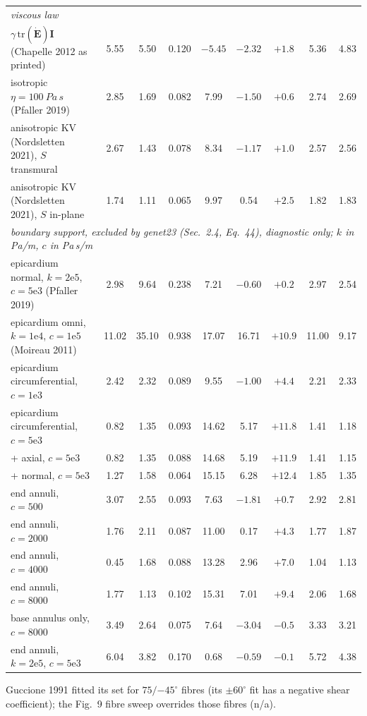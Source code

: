 \documentclass[10pt]{article}
\begin{document}
\begin{center}
\begin{longtable}{lcccccccc}
\multicolumn{9}{l}{\emph{viscous law}} \\
$\gamma\,\mathrm{tr}(\dot{\mathbf E})\mathbf I$ (Chapelle 2012 as printed) & 5.55 & 5.50 & 0.120 & $-5.45$ & $-2.32$ & $+1.8$ & 5.36 & 4.83 \\
isotropic $\eta=\SI{100}{Pa\,s}$ (Pfaller 2019) & 2.85 & 1.69 & 0.082 & 7.99 & $-1.50$ & $+0.6$ & 2.74 & 2.69 \\
anisotropic KV (Nordsletten 2021), $S$ transmural & 2.67 & 1.43 & 0.078 & 8.34 & $-1.17$ & $+1.0$ & 2.57 & 2.56 \\
anisotropic KV (Nordsletten 2021), $S$ in-plane & 1.74 & 1.11 & 0.065 & 9.97 & 0.54 & $+2.5$ & 1.82 & 1.83 \\ \midrule
\multicolumn{9}{l}{\emph{boundary support, excluded by genet23 (Sec.~2.4, Eq.~44), diagnostic only; $k$ in Pa/m, $c$ in Pa\,s/m}} \\
epicardium normal, $k=2\text{e}5$, $c=5\text{e}3$ (Pfaller 2019) & 2.98 & 9.64 & 0.238 & 7.21 & $-0.60$ & $+0.2$ & 2.97 & 2.54 \\
epicardium omni, $k=1\text{e}4$, $c=1\text{e}5$ (Moireau 2011) & 11.02 & 35.10 & 0.938 & 17.07 & 16.71 & $+10.9$ & 11.00 & 9.17 \\
epicardium circumferential, $c=1\text{e}3$ & 2.42 & 2.32 & 0.089 & 9.55 & $-1.00$ & $+4.4$ & 2.21 & 2.33 \\
epicardium circumferential, $c=5\text{e}3$ & 0.82 & 1.35 & 0.093 & 14.62 & 5.17 & $+11.8$ & 1.41 & 1.18 \\
\quad + axial, $c=5\text{e}3$ & 0.82 & 1.35 & 0.088 & 14.68 & 5.19 & $+11.9$ & 1.41 & 1.15 \\
\quad + normal, $c=5\text{e}3$ & 1.27 & 1.58 & 0.064 & 15.15 & 6.28 & $+12.4$ & 1.85 & 1.35 \\
end annuli, $c=500$ & 3.07 & 2.55 & 0.093 & 7.63 & $-1.81$ & $+0.7$ & 2.92 & 2.81 \\
end annuli, $c=2000$ & 1.76 & 2.11 & 0.087 & 11.00 & 0.17 & $+4.3$ & 1.77 & 1.87 \\
end annuli, $c=4000$ & 0.45 & 1.68 & 0.088 & 13.28 & 2.96 & $+7.0$ & 1.04 & 1.13 \\
end annuli, $c=8000$ & 1.77 & 1.13 & 0.102 & 15.31 & 7.01 & $+9.4$ & 2.06 & 1.68 \\
base annulus only, $c=8000$ & 3.49 & 2.64 & 0.075 & 7.64 & $-3.04$ & $-0.5$ & 3.33 & 3.21 \\
end annuli, $k=2\text{e}5$, $c=5\text{e}3$ & 6.04 & 3.82 & 0.170 & 0.68 & $-0.59$ & $-0.1$ & 5.72 & 4.38 \\
\bottomrule
\end{longtable}\end{center}
{\footnotesize Guccione 1991 fitted its set for $75/{-45}^\circ$ fibres (its $\pm60^\circ$ fit has a
negative shear coefficient); the Fig.~9 fibre sweep overrides those fibres (n/a).}
\end{document}
